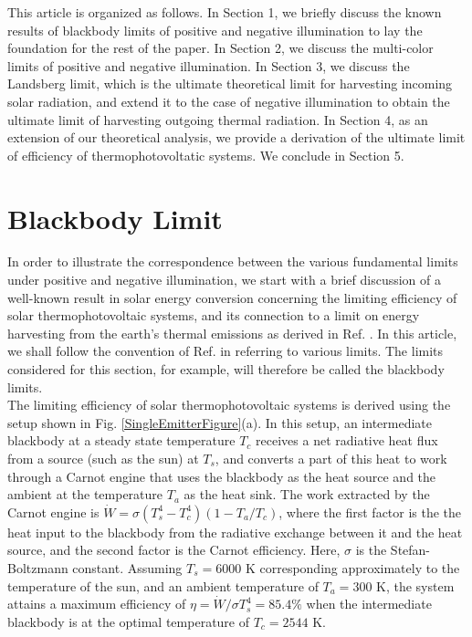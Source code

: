 \documentclass[notitlepage,onecolumn,aps,showpacs,preprintnumbers,amsmath,amssymb,superscriptaddress]{revtex4-1}
\begin{document}
This article is organized as follows. In Section 1, we briefly discuss the known results of blackbody limits of positive and negative illumination to lay the foundation for the rest of the paper. In Section 2, we discuss the multi-color limits of positive and negative illumination. In Section 3, we discuss the Landsberg limit, which is the ultimate theoretical limit for harvesting incoming solar radiation, and extend it to the case of negative illumination to obtain the ultimate limit of harvesting outgoing thermal radiation. In Section 4, as an extension of our theoretical analysis, we provide a derivation of the ultimate limit of efficiency of thermophotovoltatic systems.  We conclude in Section 5.

\section{Blackbody Limit}
In order to illustrate the correspondence between the various fundamental limits under positive and negative illumination, we start with a brief discussion of a well-known result in solar energy conversion concerning the limiting efficiency of solar thermophotovoltaic systems, and its connection to a limit on energy harvesting from the earth's thermal emissions as derived in Ref. \citep{capasso}. In this article, we shall follow the convention of Ref. \citep{greenbook} in referring to various limits. The limits considered for this section, for example, will therefore be called the blackbody limits. \\

The limiting efficiency of solar thermophotovoltaic systems is derived \citep{devosBook, greenbook} using the setup shown in Fig. \ref{SingleEmitterFigure}(a). In this setup, an intermediate blackbody at a steady state temperature $T_c$ receives a net radiative heat flux from a source (such as the sun) at $T_s$, and converts a part of this heat to work through a Carnot engine that uses the blackbody as the heat source and the ambient at the temperature $T_a$ as the heat sink. The work extracted by the Carnot engine is $\dot{W} = \sigma(T_s^4-T_c^4)(1-T_a/T_c)$, where the first factor is the the heat input to the blackbody from the radiative exchange between it and the heat source, and the second factor is the Carnot efficiency. Here, $\sigma$ is the Stefan-Boltzmann constant. Assuming $T_s = 6000$ K corresponding approximately to the temperature of the sun, and an ambient temperature of $T_a = 300$ K, the system attains a maximum efficiency of $\eta = \dot{W}/\sigma T_s^4= 85.4\%$ when the intermediate blackbody is at the optimal temperature of $T_c = 2544$ K.\\
\end{document}
